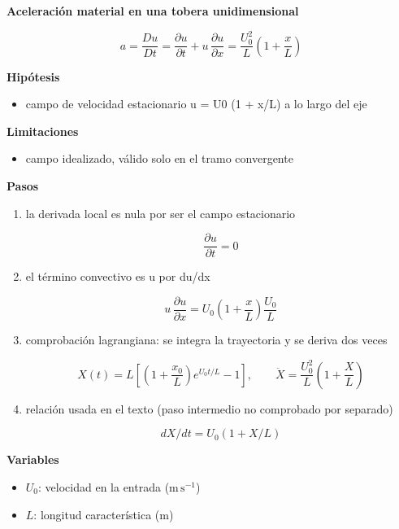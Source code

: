 \documentclass[10pt,openany]{book}
\begin{document}
\begin{tcolorbox}[title={Desarrollos del modelo}, studiumdef, breakable]

\noindent\textbf{Aceleración material en una tobera unidimensional}

\begin{equation}
a = \frac{Du}{Dt} = \frac{\partial u}{\partial t} + u\,\frac{\partial u}{\partial x} = \frac{U_0^{2}}{L}\left(1 + \frac{x}{L}\right)
\label{eq:c04-tobera}
\end{equation}

\noindent\textbf{Hipótesis}
\begin{itemize}
\item campo de velocidad estacionario u = U0 (1 + x/L) a lo largo del eje
\end{itemize}

\noindent\textbf{Limitaciones}
\begin{itemize}
\item campo idealizado, válido solo en el tramo convergente
\end{itemize}

\noindent\textbf{Pasos}
\begin{enumerate}
\item
la derivada local es nula por ser el campo estacionario

\[
\frac{\partial u}{\partial t} = 0
\]
\item
el término convectivo es u por du/dx

\[
u\,\frac{\partial u}{\partial x} = U_0\left(1 + \frac{x}{L}\right)\frac{U_0}{L}
\]
\item
comprobación lagrangiana: se integra la trayectoria y se deriva dos veces

\[
X(t) = L\left[\left(1 + \frac{x_0}{L}\right)e^{U_0 t/L} - 1\right],\qquad \ddot X = \frac{U_0^{2}}{L}\left(1 + \frac{X}{L}\right)
\]
\item
relación usada en el texto (paso intermedio no comprobado por separado)

\[
dX/dt = U_0(1 + X/L)
\]
\end{enumerate}

\noindent\textbf{Variables}
\begin{itemize}
\item $U_{0}$: velocidad en la entrada ($\mathrm{m}\,\mathrm{s}^{-1}$)
\item $L$: longitud característica ($\mathrm{m}$)
\end{itemize}




\end{tcolorbox}
\end{document}
